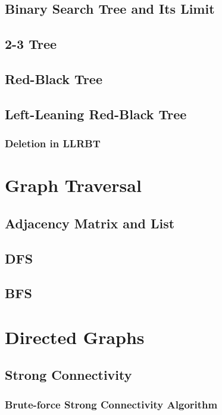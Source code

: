 \documentclass{article}
\begin{document}
\subsection{Binary Search Tree and Its Limit}

\subsection{2-3 Tree}

\subsection{Red-Black Tree}

\subsection{Left-Leaning Red-Black Tree}

\subsubsection{Deletion in LLRBT}

\section{Graph Traversal}

\subsection{Adjacency Matrix and List}

\subsection{DFS}

\subsection{BFS}

\section{Directed Graphs}

\subsection{Strong Connectivity}

\subsubsection{Brute-force Strong Connectivity Algorithm}
\end{document}
